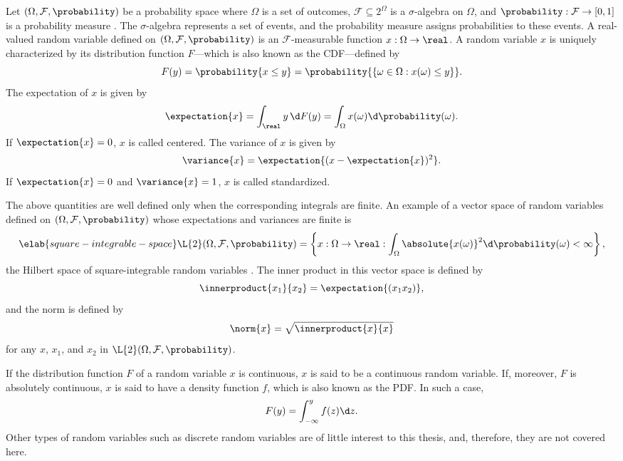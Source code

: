 Let $(\Omega, \mathcal{F}, \probability)$ be a probability space where $\Omega$
is a set of outcomes, $\mathcal{F} \subseteq 2^\Omega$ is a $\sigma$-algebra on
$\Omega$, and $\probability: \mathcal{F} \to [0, 1]$ is a probability measure
\cite{durrett2010}. The $\sigma$-algebra represents a set of events, and the
probability measure assigns probabilities to these events. A real-valued random
variable defined on $(\Omega, \mathcal{F}, \probability)$ is an
$\mathcal{F}$-measurable function $x: \Omega \to \real$. A random variable $x$
is uniquely characterized by its distribution function $F$---which is also known
as the \acf{CDF}---defined by
\begin{equation*}
  F(y) = \probability{x \leq y} = \probability{\{ \omega \in \Omega: x(\omega) \leq y \}}.
\end{equation*}
The expectation of $x$ is given by
\[
  \expectation{x} = \int_\real y \, \d F(y) = \int_\Omega x(\omega) \d \probability(\omega).
\]
If $\expectation{x} = 0$, $x$ is called centered. The variance of $x$ is given
by
\[
  \variance{x} = \expectation{(x - \expectation{x})^2}.
\]
If $\expectation{x} = 0$ and $\variance{x} = 1$, $x$ is called standardized.

The above quantities are well defined only when the corresponding integrals are
finite. An example of a vector space of random variables defined on $(\Omega,
\mathcal{F}, \probability)$ whose expectations and variances are finite is
\begin{equation} \elab{square-integrable-space}
  \L{2}(\Omega, \mathcal{F}, \probability) = \left\{ x: \Omega \to \real: \int_\Omega \absolute{x(\omega)}^2 \d \probability(\omega) < \infty \right\},
\end{equation}
the Hilbert space of square-integrable random variables \cite{janson1997}. The
inner product in this vector space is defined by
\[
  \innerproduct{x_1}{x_2} = \expectation{(x_1 x_2)},
\]
and the norm is defined by
\[
  \norm{x} = \sqrt{\innerproduct{x}{x}}
\]
for any $x$, $x_1$, and $x_2$ in $\L{2}(\Omega, \mathcal{F}, \probability)$.

If the distribution function $F$ of a random variable $x$ is continuous, $x$ is
said to be a continuous random variable. If, moreover, $F$ is absolutely
continuous, $x$ is said to have a density function $f$, which is also known as
the \acf{PDF}. In such a case,
\[
  F(y) = \int_{-\infty}^y f(z) \d z.
\]
Other types of random variables such as discrete random variables are of little
interest to this thesis, and, therefore, they are not covered here.

